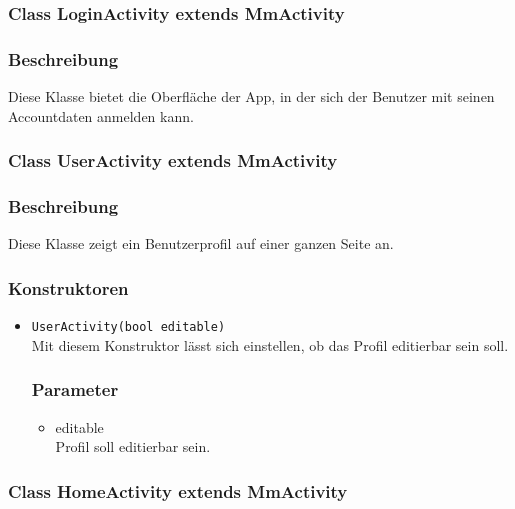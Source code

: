 \documentclass[a4paper]{scrreprt}
\begin{document}

\subsubsection{Class LoginActivity extends MmActivity}
\subsubsection*{Beschreibung}
Diese Klasse bietet die Oberfläche der App, in der sich der Benutzer mit seinen Accountdaten anmelden kann.

\subsubsection{Class UserActivity extends MmActivity}
\subsubsection*{Beschreibung}
Diese Klasse zeigt ein Benutzerprofil auf einer ganzen Seite an.

\subsubsection*{Konstruktoren}
\begin{addmargin}[25pt]{0pt}
\begin{itemize}

\item \texttt{UserActivity(bool editable)}\\
	
	Mit diesem Konstruktor lässt sich einstellen, ob das Profil editierbar sein soll. 

	\subsubsection*{Parameter}
	\begin{itemize}
	\item editable \\
		Profil soll editierbar sein.
	\end{itemize}

\end{itemize}
\end{addmargin}


\subsubsection{Class HomeActivity extends MmActivity}
\end{document}
